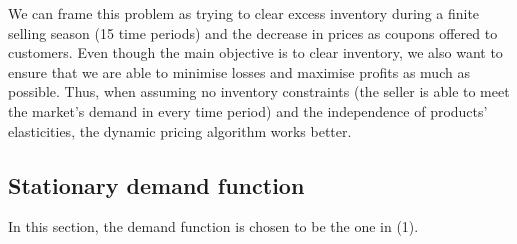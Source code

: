 \documentclass[a4paper]{article}
\begin{document}
\newline
\newline
We can frame this problem as trying to clear excess inventory during a finite selling season (15 time periods) and the decrease in prices as coupons offered to customers. Even though the main objective is to clear inventory, we also want to ensure that we are able to minimise losses and maximise profits as much as possible. Thus, when assuming no inventory constraints (the seller is able to meet the market's demand in every time period) and the independence of products' elasticities, the dynamic pricing algorithm works better.

\subsection{Stationary demand function}
In this section, the demand function is chosen to be the one in (1).
\end{document}
